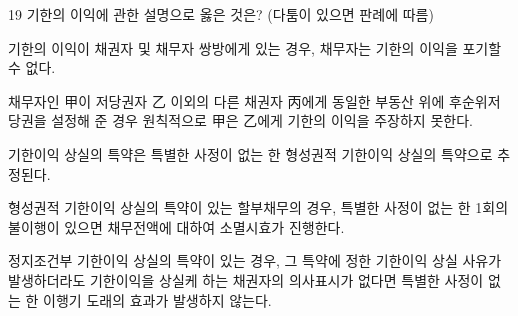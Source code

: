\begin{question}{19}
기한의 이익에 관한 설명으로 옳은 것은? (다툼이 있으면 판례에 따름)
\begin{choices}
  \item 기한의 이익이 채권자 및 채무자 쌍방에게 있는 경우, 채무자는 기한의 이익을 포기할 수 없다.
  \item 채무자인 甲이 저당권자 乙 이외의 다른 채권자 丙에게 동일한 부동산 위에 후순위저당권을 설정해 준 경우 원칙적으로 甲은 乙에게 기한의 이익을 주장하지 못한다.
  \item 기한이익 상실의 특약은 특별한 사정이 없는 한 형성권적 기한이익 상실의 특약으로 추정된다.
  \item 형성권적 기한이익 상실의 특약이 있는 할부채무의 경우, 특별한 사정이 없는 한 1회의 불이행이 있으면 채무전액에 대하여 소멸시효가 진행한다.
  \item 정지조건부 기한이익 상실의 특약이 있는 경우, 그 특약에 정한 기한이익 상실 사유가 발생하더라도 기한이익을 상실케 하는 채권자의 의사표시가 없다면 특별한 사정이 없는 한 이행기 도래의 효과가 발생하지 않는다.
\end{choices}
\end{question}
